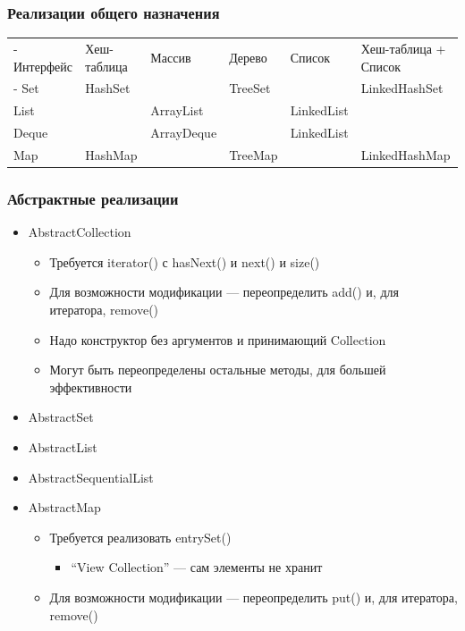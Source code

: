 \documentclass[xetex,mathserif,serif]{beamer}
\begin{document}
	\begin{frame}
		\frametitle{Реализации общего назначения}
		\begin{footnotesize}
			\begin{tabu} {| X[1 l p] | X[0.7 l p] | X[1 l p] | X[0.7 l p] | X[1 l p] | X[1.3 l p] |}
				\tabucline-
				Интерфейс  & Хеш-таблица  & Массив      & Дерево   & Список      & Хеш-таблица + Список  \\
				\tabucline-
				\everyrow{\tabucline-}
				Set        & HashSet      &             & TreeSet  &             & LinkedHashSet         \\
				List       &              & ArrayList   &          & LinkedList  &                       \\
				Deque      &              & ArrayDeque  &          & LinkedList  &                       \\
				Map        & HashMap      &             & TreeMap  &             & LinkedHashMap         \\
			\end{tabu}
		\end{footnotesize}
	\end{frame}

	\begin{frame}
		\frametitle{Абстрактные реализации}
		\begin{itemize}
			\item AbstractCollection
			\begin{itemize}
				\item Требуется iterator() с hasNext() и next() и size()
				\item Для возможности модификации --- переопределить add() и, для итератора, remove()
				\item Надо конструктор без аргументов и принимающий Collection
				\item Могут быть переопределены остальные методы, для большей эффективности
			\end{itemize}
			\item AbstractSet
			\item AbstractList
			\item AbstractSequentialList
			\item AbstractMap
			\begin{itemize}
				\item Требуется реализовать entrySet()
				\begin{itemize}
					\item ``View Collection'' --- сам элементы не хранит
				\end{itemize}
				\item Для возможности модификации --- переопределить put() и, для итератора, remove()
			\end{itemize}
		\end{itemize}
	\end{frame}
\end{document}
